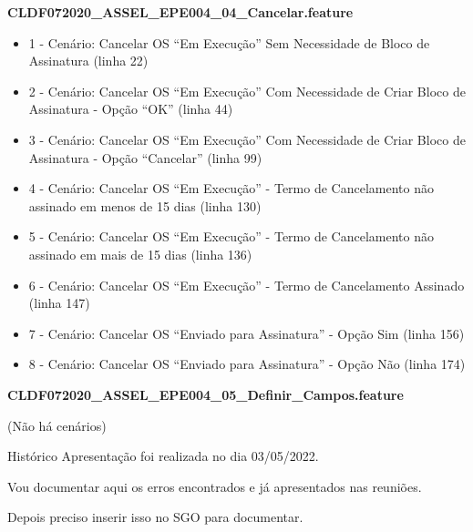 \textbf{CLDF072020\_ASSEL\_EPE004\_04\_Cancelar.feature}
\begin{itemize}
	\item 1 - Cenário: Cancelar OS ``Em Execução'' Sem Necessidade de Bloco de Assinatura (linha 22)
	\item 2 - Cenário: Cancelar OS ``Em Execução'' Com Necessidade de Criar Bloco de Assinatura - Opção ``OK'' (linha 44)
	\item 3 - Cenário: Cancelar OS ``Em Execução'' Com Necessidade de Criar Bloco de Assinatura - Opção ``Cancelar'' (linha 99)
	\item 4 - Cenário: Cancelar OS ``Em Execução'' - Termo de Cancelamento não assinado em menos de 15 dias (linha 130)
	\item 5 - Cenário: Cancelar OS ``Em Execução'' - Termo de Cancelamento não assinado em mais de 15 dias (linha 136)
	\item 6 - Cenário: Cancelar OS ``Em Execução'' - Termo de Cancelamento Assinado (linha 147)
	\item 7 - Cenário: Cancelar OS ``Enviado para Assinatura'' - Opção Sim (linha 156)
	\item 8 - Cenário: Cancelar OS ``Enviado para Assinatura'' - Opção Não (linha 174)
\end{itemize}

\textbf{CLDF072020\_ASSEL\_EPE004\_05\_Definir\_Campos.feature}

(Não há cenários)



\begin{nota}[1]{Histórico}
	Apresentação foi realizada no dia 03/05/2022.

	Vou documentar aqui os erros encontrados e já apresentados nas reuniões.

	Depois preciso inserir isso no SGO para documentar.
\end{nota}

\newcommand{\sosFu}{CLDF072020\_ASSEL\_EPE004\_01\_Listar.feature}
\newcommand{\sosFuCu}{Cenário: Apresentar Unidades do Usuário (linha 27)}
\newcommand{\sosFuCd}{Cenário: Listar Solicitações da Unidade (linha 37)}
\newcommand{\sosFuCt}{Cenário: Listar Solicitações da Última Unidade Selecionada (linha 47)}
\newcommand{\sosFuCq}{Cenário: Listar Todos (linha 54)}
\newcommand{\sosFuCc}{Cenário: Ordenar (linha 58)}
\newcommand{\sosFuCs}{Cenário: Pesquisar Parcialmente Por Tipo de Dado (linha 62)}
\newcommand{\sosFuCe}{Cenário: Pesquisar Dado Inexistente (linha 71)}
\newcommand{\sosFuCo}{Cenário: Filtrar Status (linha 83)}
\newcommand{\sosFuCn}{Cenário: Apresentar Ações Desabilitadas (linha 90)}
\newcommand{\sosFuCuz}{Esquema do Cenário: Apresentar Código de Grupo 1 (linha 97)}
\newcommand{\sosFuCuu}{Esquema do Cenário: Apresentar Código de Grupo 2 - Minutas de Proposição (linha 110)}
\newcommand{\sosFuCud}{Esquema do Cenário: Apresentar Código de Grupo 3 - Minutas de Parecer (linha 128)}
\newcommand{\sosFuCut}{Cenário: Os Assinada (linha 161)}
\newcommand{\sosFuCuq}{Cenário: OS Não Assinada em menos de 15 dias (linha 178)}
\newcommand{\sosFuCuc}{Cenário: OS Não Assinada em mais que 15 dias (linha 190)}

